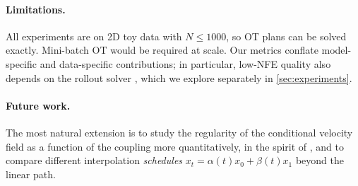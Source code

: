 \documentclass[11pt,a4paper]{article}
\begin{document}
\paragraph{Limitations.}  All experiments are on 2D toy data with $N \le 1000$,
so OT plans can be solved exactly.  Mini-batch OT \cite{tong2023improving} would
be required at scale.  Our metrics conflate model-specific and data-specific
contributions; in particular, low-NFE quality also depends on the rollout
solver \cite{shaul2023bespoke}, which we explore separately in
\cref{sec:experiments}.

\paragraph{Future work.}  The most natural extension is to study the regularity
of the conditional velocity field as a function of the coupling more
quantitatively, in the spirit of \cite{kornilov2024optimal}, and to compare
different interpolation \emph{schedules} $x_t = \alpha(t) x_0 + \beta(t) x_1$
beyond the linear path.



\end{document}
